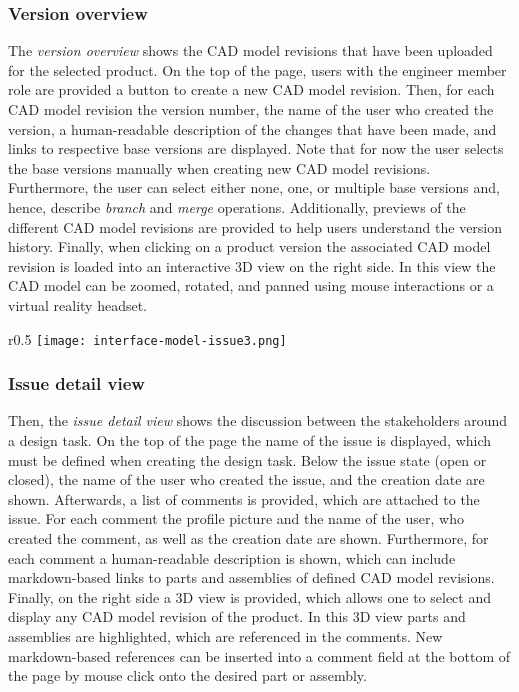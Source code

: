 \subsubsection{Version overview}

The \textit{version overview} shows the CAD model revisions that have been uploaded for the selected product.
On the top of the page, users with the engineer member role are provided a button to create a new CAD model revision.
Then, for each CAD model revision the version number, the name of the user who created the version, a human-readable description of the changes that have been made, and links to respective base versions are displayed.
Note that for now the user selects the base versions manually when creating new CAD model revisions.
Furthermore, the user can select either none, one, or multiple base versions and, hence, describe \textit{branch} and \textit{merge} operations.
Additionally, previews of the different CAD model revisions are provided to help users understand the version history.
Finally, when clicking on a product version the associated CAD model revision is loaded into an interactive 3D view on the right side.
In this view the CAD model can be zoomed, rotated, and panned using mouse interactions or a virtual reality headset.

\begin{wrapfigure}{r}{0.5\textwidth}
    \centering
    \texttt{[image: interface-model-issue3.png]}
    \label{fig:screenshot-issue}
\end{wrapfigure}

\subsubsection{Issue detail view}

Then, the \textit{issue detail view} shows the discussion between the stakeholders around a design task.
On the top of the page the name of the issue is displayed, which must be defined when creating the design task.
Below the issue state (open or closed), the name of the user who created the issue, and the creation date are shown.
Afterwards, a list of comments is provided, which are attached to the issue.
For each comment the profile picture and the name of the user, who created the comment, as well as the creation date are shown.
Furthermore, for each comment a human-readable description is shown, which can include markdown-based links to parts and assemblies of defined CAD model revisions.
Finally, on the right side a 3D view is provided, which allows one to select and display any CAD model revision of the product.
In this 3D view parts and assemblies are highlighted, which are referenced in the comments.
New markdown-based references can be inserted into a comment field at the bottom of the page by mouse click onto the desired part or assembly.

